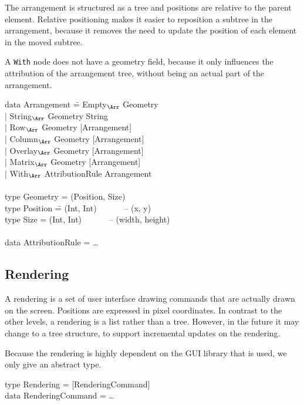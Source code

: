 The arrangement is structured as a tree and positions are relative to the parent element. Relative positioning makes it easier to reposition a subtree in the arrangement, because it removes the need to update the position of each element in the moved subtree. 

A \verb|With| node does not have a geometry field, because it only influences the attribution of the arrangement tree, without being an actual part of the arrangement. 
\ttfamily
\begin{tabbing}
data Arrangement \= = Empty$_{\Arr}$ Geometry\\
                 \> | String$_{\Arr}$ Geometry String\\
                 \> | Row$_{\Arr}$ Geometry [Arrangement]\\
                 \> | Column$_{\Arr}$ Geometry [Arrangement]\\
                 \> | Overlay$_{\Arr}$ Geometry [Arrangement]\\
                 \> | Matrix$_{\Arr}$ Geometry [Arrangement]\\
                 \> | With$_{\Arr}$ AttributionRule Arrangement\\
\\
type Geometry = (Position, Size)\\
type Position \= = (Int, Int)  ~~~~~~-- (x,  y)\\
type Size      \> = (Int, Int)  ~~~~~~-- (width, height)\\
\\
data AttributionRule = \dots\\
\end{tabbing}
\rmfamily

%																
\subsection{Rendering}

A rendering is a set of user interface drawing commands that are actually drawn on the screen. Positions are expressed in pixel coordinates. In contrast to the other levels, a rendering is a list rather than a tree. However, in the future it may change to a tree structure, to support incremental updates on the rendering. 

Because the rendering is highly dependent on the GUI library that is used, we only give an abstract type.

\noindent
\ttfamily
\begin{tabbing}
type Rendering = [RenderingCommand]\\
data RenderingCommand = \dots
\end{tabbing}
\rmfamily




